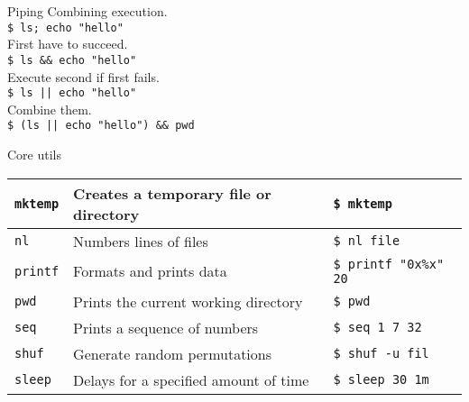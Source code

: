 \documentclass{beamer}
\let\tt\texttt
\begin{document}
\begin{frame}{Piping}
        Combining execution.     \\
        \tt{\$ ls; echo "hello"}        \\

        First have to succeed.    \\
        \tt{\$ ls \&\& echo "hello"}        \\

        Execute second if first fails.    \\
        \tt{\$ ls || echo "hello"}        \\

        Combine them.    \\
        \tt{\$ (ls || echo "hello") \&\& pwd}        \\
\end{frame}

\begin{frame}{Core utils}
        \begin{tabular}{p{} p{} | p{}}
                \hline
                \tt{mktemp}             &
                Creates a temporary file or directory &
                \tt{\$ mktemp }       \\
                \hline
                \tt{nl}             &
                Numbers lines of files &
                \tt{\$ nl file}       \\
                \hline
                \tt{printf}             &
                Formats and prints data  &
                \tt{\$ printf "0x\%x" 20}       \\
                \hline
                \tt{pwd}             &
                Prints the current working directory &
                \tt{\$ pwd}       \\
                \hline
                \tt{seq}             &
                Prints a sequence of numbers  &
                \tt{\$ seq 1 7 32}       \\
                \hline
                \tt{shuf}             &
                Generate random permutations &
                \tt{\$ shuf -u fil}       \\
                \hline
                \tt{sleep}             &
                Delays for a specified amount of time &
                \tt{\$ sleep 30 1m}       \\
                \hline
        \end{tabular}
\end{frame}
\end{document}
